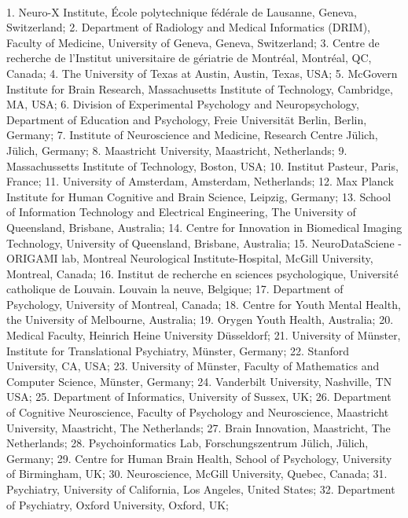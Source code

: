 \documentclass[10pt,a4paper,twocolumns]{proc}
\newcommand{\affiliations}[1]{{\scriptsize #1} \\}
\begin{document}
\\
\affiliations{1. Neuro-X Institute, École polytechnique fédérale de Lausanne, Geneva, Switzerland; %
2. Department of Radiology and Medical Informatics (DRIM), Faculty of Medicine, University of Geneva, Geneva, Switzerland; %
3. Centre de recherche de l'Institut universitaire de gériatrie de Montréal, Montréal, QC, Canada; %
4. The University of Texas at Austin, Austin, Texas, USA; %
5. McGovern Institute for Brain Research, Massachusetts Institute of Technology, Cambridge, MA, USA; %
6. Division of Experimental Psychology and Neuropsychology, Department of Education and Psychology, Freie Universität Berlin, Berlin, Germany; %
7. Institute of Neuroscience and Medicine, Research Centre Jülich, Jülich, Germany; %
8. Maastricht University, Maastricht, Netherlands; %
9. Massachussetts Institute of Technology, Boston, USA; %
10. Institut Pasteur, Paris, France; %
11. University of Amsterdam, Amsterdam, Netherlands; %
12. Max Planck Institute for Human Cognitive and Brain Science, Leipzig, Germany; %
13. School of Information Technology and Electrical Engineering, The University of Queensland, Brisbane, Australia; %
14. Centre for Innovation in Biomedical Imaging Technology, University of Queensland, Brisbane, Australia; %
15. NeuroDataSciene - ORIGAMI lab, Montreal Neurological Institute-Hospital, McGill University, Montreal, Canada; %
16. Institut de recherche en sciences psychologique, Université catholique de Louvain. Louvain la neuve, Belgique; %
17. Department of Psychology, University of Montreal, Canada; %
18. Centre for Youth Mental Health, the University of Melbourne, Australia; %
19. Orygen Youth Health, Australia; %
20. Medical Faculty, Heinrich Heine University Düsseldorf; %
21. University of Münster, Institute for Translational Psychiatry, Münster, Germany; %
22. Stanford University, CA, USA; %
23. University of Münster, Faculty of Mathematics and Computer Science, Münster, Germany; %
24. Vanderbilt University, Nashville, TN USA; %
25. Department of Informatics, University of Sussex, UK; %
26. Department of Cognitive Neuroscience, Faculty of Psychology and Neuroscience, Maastricht University, Maastricht, The Netherlands; %
27. Brain Innovation, Maastricht, The Netherlands; %
28. Psychoinformatics Lab, Forschungszentrum J\"ulich, J\"ulich, Germany; %
29. Centre for Human Brain Health, School of Psychology, University of Birmingham, UK; %
30. Neuroscience, McGill University, Quebec, Canada; %
31. Psychiatry, University of California, Los Angeles, United States; %
32. Department of Psychiatry, Oxford University, Oxford, UK; %
}
\end{document}

